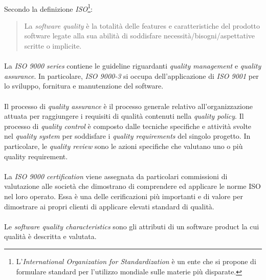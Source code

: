 \documentclass[11pt,a4paper,english]{article}
\begin{document}
\paragraph{} Secondo la definizione \emph{ISO}\footnote{L'\emph{International Organization for Standardization} è un ente che si propone di formulare standard per l'utilizzo mondiale sulle materie più disparate.}:
\begin{quote}
    La \emph{software quality} è la totalità delle features e caratteristiche del prodotto software legate alla sua abilità di soddisfare necessità/bisogni/aspettative scritte o implicite.
\end{quote}

\paragraph{} La \emph{ISO 9000 series} contiene le guideline riguardanti \emph{quality management} e \emph{quality assurance}. In particolare, \emph{ISO 9000-3} si occupa dell'applicazione di \emph{ISO 9001} per lo sviluppo, fornitura e manutenzione del software. 

\paragraph{} Il processo di \emph{quality assurance} è il processo generale relativo all'organizzazione attuata per raggiungere i requisiti di qualità contenuti nella \emph{quality policy}. Il processo di \emph{quality control} è composto dalle tecniche specifiche e attività svolte nel \emph{quality system} per soddisfare i \emph{quality requirements} del singolo progetto. In particolare, le \emph{quality review} sono le azioni specifiche che valutano uno o più quality requirement. 

\paragraph{} La \emph{ISO 9000 certification} viene assegnata da particolari commissioni di valutazione alle società che dimostrano di comprendere ed applicare le norme ISO nel loro operato. Essa è una delle cerificazioni più importanti e di valore per dimostrare ai propri clienti di applicare elevati standard di qualità.

\paragraph{} Le \emph{software quality characteristics} sono gli attributi di un software product la cui qualità è descritta e valutata. 
\end{document}
